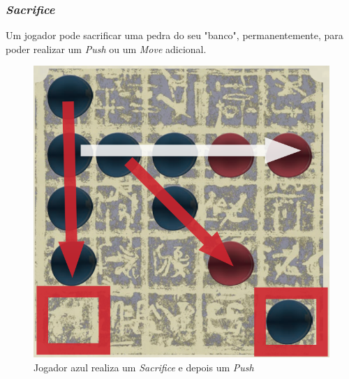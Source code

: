 \documentclass[a4paper]{article}
\begin{document}
\subsubsection{\textit{Sacrifice}}

Um jogador pode sacrificar uma pedra do seu "banco", permanentemente, para poder realizar um \textit{Push} ou um \textit{Move} adicional.

\begin{figure}[!htb]
\centering
\includegraphics[scale=0.3]{push2.png} 
\caption{Jogador azul realiza um \textit{Sacrifice} e depois um \textit{Push}}
\end{figure}

\newpage
\end{document}
